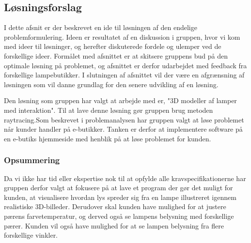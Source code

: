 \subsection{Løsningsforslag}
I dette afsnit er der beskrevet en ide til løsningen af den endelige problemformulering. Ideen er resultatet af en diskussion i gruppen, hvor vi kom med ideer til løsninger, og herefter diskuterede fordele og ulemper ved de forskellige ideer. Formålet med afsnittet er at skitsere gruppens bud på den optimale løsning på problemet, og afsnittet er derfor udarbejdet med feedback fra forskellige lampebutikker. I slutningen af afsnittet vil der være en afgrænsning af løsningen som vil danne grundlag for den senere udvikling af en løsning.

Den løsning som gruppen har valgt at arbejde med er, "3D modeller af lamper med interaktion". Til at lave denne løsning gør gruppen brug metoden raytracing.\newline Som beskrevet i problemanalysen har gruppen valgt at løse problemet når kunder handler på e-butikker. Tanken er derfor at implementere software på en e-butiks hjemmeside med henblik på at løse problemet for kunden.





\subsubsection*{Opsummering}

Da vi ikke har tid eller ekspertise nok til at opfylde alle kravspecifikationerne har gruppen derfor valgt at fokusere på at lave et program der gør det muligt for kunden, at visualisere hvordan lys spreder sig fra en lampe illustreret igennem realistiske 3D-billeder. Derudover skal kunden have mulighed for at justere pærens farvetemperatur, og derved også se lampens belysning med forskellige pærer. Kunden vil også have mulighed for at se lampen belysning fra flere forskellige vinkler. 